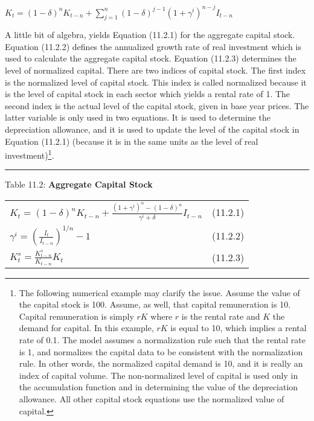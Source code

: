 \documentclass{article}
\begin{document}
\begin{center}

$K_t = (1 - \delta)^n K_{t-n} + \displaystyle \sum^n_{j=1} (1-\delta)^{j-1} (1 + \gamma^i)^{n-j} I_{t-n}$

\end{center}

A little bit of algebra, yields Equation (11.2.1) for the aggregate capital stock. Equation (11.2.2) defines the annualized growth rate of real investment which is used to calculate the aggregate capital stock. Equation (11.2.3) determines the level of normalized capital. There are two indices of capital stock. The first index is the normalized level of capital stock. This index is called normalized because it is the level of capital stock in each sector which yields a rental rate of 1. The second index is the actual level of the capital stock, given in base year prices. The latter variable is only used in two equations. It is used to determine the depreciation allowance, and it is used to update the level of the capital stock in Equation (11.2.1) (because it is in the same units as the level of real investment)\footnote{The following numerical example may clarify the issue. Assume the value of the capital stock is 100. Assume, as well, that capital remuneration is 10. Capital remuneration is simply $rK$ where $r$ is the rental rate and $K$ the demand for capital. In this example, $rK$ is equal to 10, which implies a rental rate of 0.1. The model assumes a normalization rule such that the rental rate is 1, and normalizes the capital data to be consistent with the normalization rule. In other words, the normalized capital demand is 10, and it is really an index of capital volume. The non-normalized level of capital is used only in the accumulation function and in determining the value of the depreciation allowance. All other capital stock equations use the normalized value of capital.}.

\newpage
\noindent\rule{\linewidth}{0.4pt}
\begin{center}
\begin{large}
{\centering Table 11.2: \textbf{Aggregate Capital Stock} \par}


\begin{tabular}{>{\raggedright}p{} l}


$K_t = (1-\delta)^n K_{t-n} + \frac{(1+\gamma^i)^n - (1-\delta)^n}{\gamma^i + \delta} I_{t-n}$ & (11.2.1) \\[15pt]

$\gamma^i = \left(\frac{I_t}{I_{t-n}}\right)^{1/n} - 1$ & (11.2.2) \\[15pt]

$K^s_t = \frac{K^s_{t-n}}{K_{t-n}}K_t$ & (11.2.3) \\[20pt]

\hline
\end{tabular}
\end{large}
\end{center}
\end{document}
